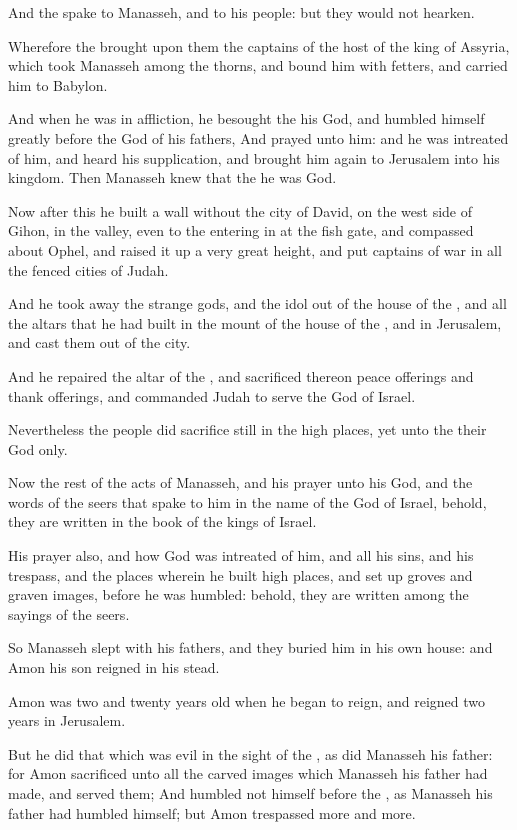 \verse And the \LORD spake to Manasseh, and to his people: but they would not hearken.

\verse Wherefore the \LORD brought upon them the captains of the host of the king of Assyria, which took Manasseh among the thorns, and bound him with fetters, and carried him to Babylon.

\verse And when he was in affliction, he besought the \LORD his God, and humbled himself greatly before the God of his fathers, \verse And prayed unto him: and he was intreated of him, and heard his supplication, and brought him again to Jerusalem into his kingdom.  Then Manasseh knew that the \LORD he was God.

\verse Now after this he built a wall without the city of David, on the west side of Gihon, in the valley, even to the entering in at the fish gate, and compassed about Ophel, and raised it up a very great height, and put captains of war in all the fenced cities of Judah.

\verse And he took away the strange gods, and the idol out of the house of the \LORD, and all the altars that he had built in the mount of the house of the \LORD, and in Jerusalem, and cast them out of the city.

\verse And he repaired the altar of the \LORD, and sacrificed thereon peace offerings and thank offerings, and commanded Judah to serve the \LORD God of Israel.

\verse Nevertheless the people did sacrifice still in the high places, yet unto the \LORD their God only.

\verse Now the rest of the acts of Manasseh, and his prayer unto his God, and the words of the seers that spake to him in the name of the \LORD God of Israel, behold, they are written in the book of the kings of Israel.

\verse His prayer also, and how God was intreated of him, and all his sins, and his trespass, and the places wherein he built high places, and set up groves and graven images, before he was humbled: behold, they are written among the sayings of the seers.

\verse So Manasseh slept with his fathers, and they buried him in his own house: and Amon his son reigned in his stead.

\verse Amon was two and twenty years old when he began to reign, and reigned two years in Jerusalem.

\verse But he did that which was evil in the sight of the \LORD, as did Manasseh his father: for Amon sacrificed unto all the carved images which Manasseh his father had made, and served them; \verse And humbled not himself before the \LORD, as Manasseh his father had humbled himself; but Amon trespassed more and more.

